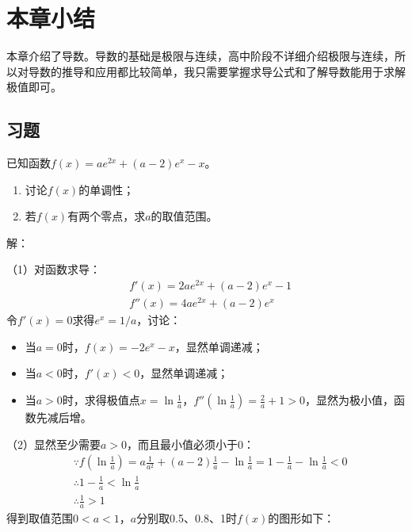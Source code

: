 \section{本章小结}

本章介绍了导数。导数的基础是极限与连续，高中阶段不详细介绍极限与连续，所以对导数的推导和应用都比较简单，我只需要掌握求导公式和了解导数能用于求解极值即可。

\subsection{习题}

\begin{example}
已知函数$f\left( x \right) =ae^{2x}+\left( a-2 \right) e^x-x$。
\begin{enumerate}
    \item 讨论$f\left( x \right) $的单调性；
    \item 若$f\left( x \right) $有两个零点，求$a$的取值范围。
\end{enumerate}
\end{example}

解：

（1）对函数求导：
\begin{align*}
&f'\left( x \right) =2ae^{2x}+\left( a-2 \right) e^x-1 \\
&f''\left( x \right) =4ae^{2x}+\left( a-2 \right) e^x
\end{align*}
令$f'\left( x \right) =0$求得$e^x=1/a$，讨论：
\begin{itemize}
    \item 当$a=0$时，$f\left( x \right) =-2e^x-x$，显然单调递减；
    \item 当$a<0$时，$f'\left( x \right) <0$，显然单调递减；
    \item 当$a>0$时，求得极值点$x=\ln \frac{1}{a}$，$f''\left( \ln \frac{1}{a} \right) =\frac{2}{a}+1>0$，显然为极小值，函数先减后增。
\end{itemize}

（2）显然至少需要$a>0$，而且最小值必须小于0：
\begin{align*}
&\because f\left( \ln \frac{1}{a} \right) =a\frac{1}{a^2}+\left( a-2 \right) \frac{1}{a}-\ln \frac{1}{a}=1-\frac{1}{a}-\ln \frac{1}{a}<0 \\
&\therefore 1-\frac{1}{a}<\ln \frac{1}{a} \\
&\therefore \frac{1}{a}>1
\end{align*}
得到取值范围$0<a<1$，$a$分别取0.5、0.8、1时$f\left( x \right) $的图形如下：


